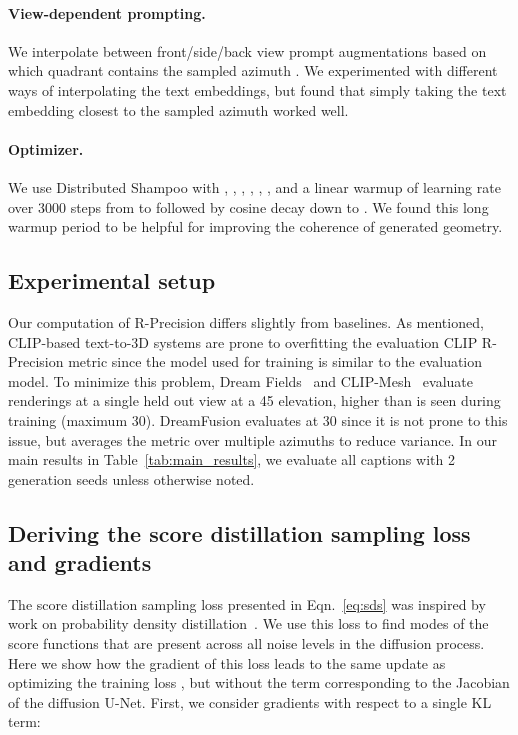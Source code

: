 \documentclass{article} \usepackage{iclr2023_conference,times}
\newcommand{\dreamfusion}{DreamFusion\xspace}
\begin{document}
\paragraph{View-dependent prompting.} We interpolate between front/side/back view prompt augmentations based on which quadrant contains the sampled azimuth . We experimented with different ways of interpolating the text embeddings, but found that simply taking the text embedding closest to the sampled azimuth worked well. 

\paragraph{Optimizer.}
We use Distributed Shampoo \citep{distributedshampoo}
 with , , , , , , and a linear warmup of learning rate over 3000 steps from  to  followed by cosine decay down to . We found this long warmup period to be helpful for improving the coherence of generated geometry.

\subsection{Experimental setup}
\label{sec:extra_evaluation_setup}

Our computation of R-Precision differs slightly from baselines. As mentioned, CLIP-based text-to-3D systems are prone to overfitting the evaluation CLIP R-Precision metric since the model used for training is similar to the evaluation model. To minimize this problem, Dream Fields~\citep{jain2021dreamfields} and CLIP-Mesh~\citep{clipmesh} evaluate renderings at a single held out view at a 45 elevation, higher than is seen during training (maximum 30). \dreamfusion evaluates at 30 since it is not prone to this issue, but averages the metric over multiple azimuths to reduce variance. In our main results in Table~\ref{tab:main_results}, we evaluate all captions with 2 generation seeds unless otherwise noted.









\subsection{Deriving the score distillation sampling loss and gradients}
\label{sec:appendix:vos_math}
The score distillation sampling loss  presented in Eqn.~\ref{eq:sds} was inspired by work on probability density distillation~\citep{Huang2019ProbabilityDA, Ping2019ClariNetPW, Oord2018ParallelWF}. We use this loss to find modes of the score functions that are present across all noise levels in the diffusion process. Here we show how the gradient of this loss leads to the same update as optimizing the training loss , but without the term corresponding to the Jacobian of the diffusion U-Net. First, we consider gradients with respect to a single KL term:
\end{document}
